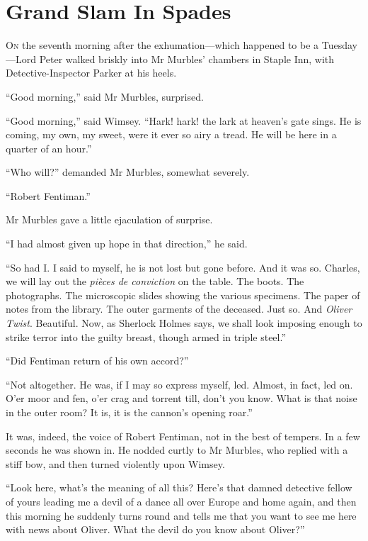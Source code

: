 \chapter{Grand Slam In Spades}

\lettrine[lines=4]{O}{n} the seventh morning after the exhumation\allowbreak---\allowbreak which happen\-ed to be a Tuesday\allowbreak---\allowbreak Lord Peter walked briskly into Mr Murb\-les' chambers in Staple Inn, with Detective-Inspector Parker at his heels.

\enquote{Good morning,} said Mr Murbles, surprised.

\enquote{Good morning,} said Wimsey. \enquote{Hark! hark! the lark at heaven's gate sings. He is coming, my own, my sweet, were it ever so airy a tread. He will be here in a quarter of an hour.}

\enquote{Who will?} demanded Mr Murbles, somewhat severely.

\enquote{Robert Fentiman.}

Mr Murbles gave a little ejaculation of surprise.

\enquote{I had almost given up hope in that direction,} he said.

\enquote{So had I. I said to myself, he is not lost but gone before. And it was so. Charles, we will lay out the \textit{pièces de conviction} on the table. The boots. The photographs. The microscopic slides showing the various specimens. The paper of notes from the library. The outer garments of the deceased. Just so. And \textit{Oliver Twist}. Beautiful. Now, as Sherlock Holmes says, we shall look imposing enough to strike terror into the guilty breast, though armed in triple steel.}

\enquote{Did Fentiman return of his own accord?}

\enquote{Not altogether. He was, if I may so express myself, led. Almost, in fact, led on. O'er moor and fen, o'er crag and torrent till, don't you know. What is that noise in the outer room? It is, it is the cannon's opening roar.}

It was, indeed, the voice of Robert Fentiman, not in the best of tempers. In a few seconds he was shown in. He nodded curtly to Mr Murbles, who replied with a stiff bow, and then turned violently upon Wimsey.

\enquote{Look here, what's the meaning of all this? Here's that damned detective fellow of yours leading me a devil of a dance all over Europe and home again, and then this morning he suddenly turns round and tells me that you want to see me here with news about Oliver. What the devil do you know about Oliver?}

